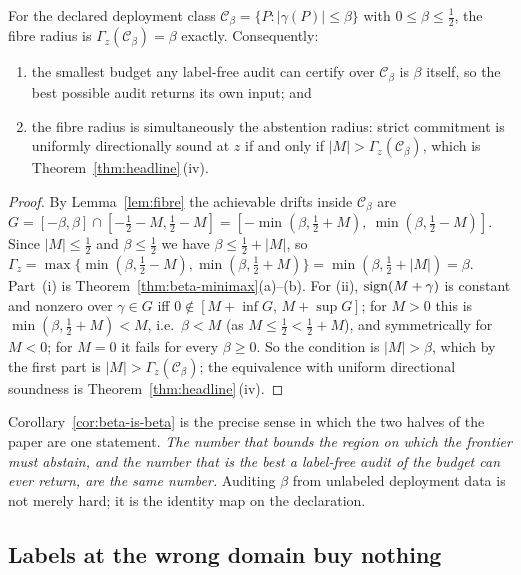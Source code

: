 \begin{corollary}\label{cor:beta-is-beta}
For the declared deployment class $\mathcal C_\beta=\{P:|\gamma(P)|\le\beta\}$ with
$0\le\beta\le\tfrac12$, the fibre radius is $\Gamma_z(\mathcal C_\beta)=\beta$ exactly.
Consequently:
\begin{enumerate}
\item[\textnormal{(i)}] the smallest budget any label-free audit can certify over
$\mathcal C_\beta$ is $\beta$ itself, so the best possible audit returns its own input; and
\item[\textnormal{(ii)}] the fibre radius is simultaneously the abstention radius: strict
commitment is uniformly directionally sound at $z$ if and only if
$|M|>\Gamma_z(\mathcal C_\beta)$, which is Theorem~\ref{thm:headline}\,(iv).
\end{enumerate}
\end{corollary}
\begin{proof}
By Lemma~\ref{lem:fibre} the achievable drifts inside $\mathcal C_\beta$ are
$G=[-\beta,\beta]\cap[-\tfrac12-M,\tfrac12-M]
=[-\min(\beta,\tfrac12+M),\ \min(\beta,\tfrac12-M)]$. Since $|M|\le\tfrac12$ and
$\beta\le\tfrac12$ we have $\beta\le\tfrac12+|M|$, so
$\Gamma_z=\max\{\min(\beta,\tfrac12-M),\min(\beta,\tfrac12+M)\}=\min(\beta,\tfrac12+|M|)=\beta$.
Part~(i) is Theorem~\ref{thm:beta-minimax}(a)--(b). For (ii), $\operatorname{sign}(M+\gamma)$ is constant
and nonzero over $\gamma\in G$ iff $0\notin[M+\inf G,\,M+\sup G]$; for $M>0$ this is
$\min(\beta,\tfrac12+M)<M$, i.e.\ $\beta<M$ (as $M\le\tfrac12<\tfrac12+M$), and symmetrically
for $M<0$; for $M=0$ it fails for every $\beta\ge0$. So the condition is $|M|>\beta$, which by
the first part is $|M|>\Gamma_z(\mathcal C_\beta)$; the equivalence with uniform directional
soundness is Theorem~\ref{thm:headline}\,(iv).
\end{proof}

\noindent Corollary~\ref{cor:beta-is-beta} is the precise sense in which the two halves of
the paper are one statement. \emph{The number that bounds the region on which the frontier
must abstain, and the number that is the best a label-free audit of the budget can ever
return, are the same number.} Auditing $\beta$ from unlabeled deployment data is not merely
hard; it is the identity map on the declaration.

\subsection{Labels at the wrong domain buy nothing}

